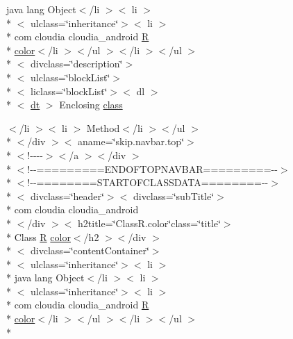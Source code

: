 \begin{DoxyCompactItemize}
 java lang Object$<$/li $>$$<$ li $>$\\*
$<$ ulclass=\char`\"{}inheritance\char`\"{}$>$$<$ li $>$\\*
 com cloudia cloudia\-\_\-android \hyperlink{index-16_8html_a31e8fe59be5c20ce90a0090e28a0c1fe}{R} \\*
\hyperlink{index-3_8html_a1491993f9d93ab4bc0fdec8302f292a3}{color}$<$/li $>$$<$/ul $>$$<$/li $>$$<$/ul $>$\\*
$<$ divclass=\char`\"{}description\char`\"{}$>$\\*
$<$ ulclass=\char`\"{}block\-List\char`\"{}$>$\\*
$<$ liclass=\char`\"{}block\-List\char`\"{}$>$$<$ dl $>$\\*
$<$ \hyperlink{stylesheet_8css_a107565fb4039d33b041380d6e0ea1d80}{dt} $>$ Enclosing \hyperlink{_r_8color_8html_a16e32066c7370a6301ecb20f000af222}{class}
\item 
$<$/li $>$$<$ li $>$ Method$<$/li $>$$<$/ul $>$\\*
$<$/div $>$$<$ aname=\char`\"{}skip.\-navbar.\-top\char`\"{}$>$\\*
$<$!-\/-\/-\/-\/$>$$<$/a $>$$<$/div $>$\\*
$<$!-\/-\/=========E\-N\-D\-O\-F\-T\-O\-P\-N\-A\-V\-B\-A\-R=========-\/-\/$>$\\*
$<$!-\/-\/========S\-T\-A\-R\-T\-O\-F\-C\-L\-A\-S\-S\-D\-A\-T\-A========-\/-\/$>$\\*
$<$ divclass=\char`\"{}header\char`\"{}$>$$<$ divclass=\char`\"{}sub\-Title\char`\"{}$>$\\*
 com cloudia cloudia\-\_\-android\\*
$<$/div $>$$<$ h2title=\char`\"{}Class\-R.\-color\char`\"{}class=\char`\"{}title\char`\"{}$>$\\*
 Class \hyperlink{index-16_8html_a31e8fe59be5c20ce90a0090e28a0c1fe}{R} \hyperlink{index-3_8html_a1491993f9d93ab4bc0fdec8302f292a3}{color}$<$/h2 $>$$<$/div $>$\\*
$<$ divclass=\char`\"{}content\-Container\char`\"{}$>$\\*
$<$ ulclass=\char`\"{}inheritance\char`\"{}$>$$<$ li $>$\\*
 java lang Object$<$/li $>$$<$ li $>$\\*
$<$ ulclass=\char`\"{}inheritance\char`\"{}$>$$<$ li $>$\\*
 com cloudia cloudia\-\_\-android \hyperlink{index-16_8html_a31e8fe59be5c20ce90a0090e28a0c1fe}{R} \\*
\hyperlink{index-3_8html_a1491993f9d93ab4bc0fdec8302f292a3}{color}$<$/li $>$$<$/ul $>$$<$/li $>$$<$/ul $>$\\*

\end{DoxyCompactItemize}
